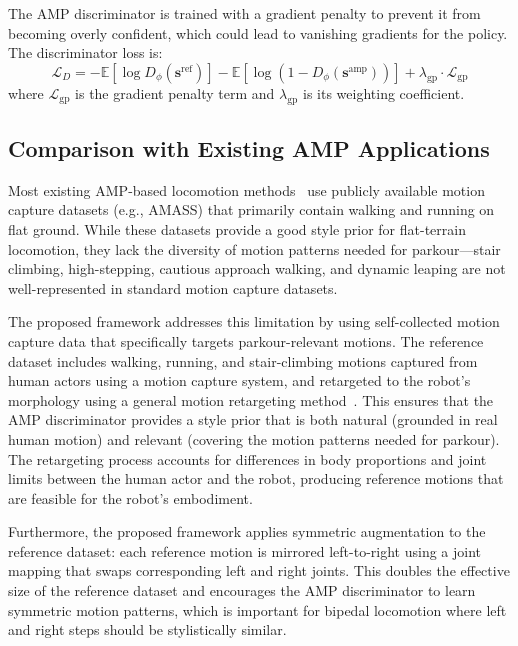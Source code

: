 The AMP discriminator is trained with a gradient penalty to prevent it from becoming overly confident, which could lead to vanishing gradients for the policy. The discriminator loss is:
\begin{equation}
    \mathcal{L}_D = -\mathbb{E}[\log D_\phi(\mathbf{s}^{\text{ref}})] - \mathbb{E}[\log(1 - D_\phi(\mathbf{s}^{\text{amp}}))] + \lambda_{\text{gp}} \cdot \mathcal{L}_{\text{gp}}
\end{equation}
where $\mathcal{L}_{\text{gp}}$ is the gradient penalty term and $\lambda_{\text{gp}}$ is its weighting coefficient.

\subsection{Comparison with Existing AMP Applications}

Most existing AMP-based locomotion methods~\cite{peng2021amp,zhang2024advdiscriminators} use publicly available motion capture datasets (e.g., AMASS) that primarily contain walking and running on flat ground. While these datasets provide a good style prior for flat-terrain locomotion, they lack the diversity of motion patterns needed for parkour---stair climbing, high-stepping, cautious approach walking, and dynamic leaping are not well-represented in standard motion capture datasets.

The proposed framework addresses this limitation by using self-collected motion capture data that specifically targets parkour-relevant motions. The reference dataset includes walking, running, and stair-climbing motions captured from human actors using a motion capture system, and retargeted to the robot's morphology using a general motion retargeting method~\cite{araujo2024retargeting}. This ensures that the AMP discriminator provides a style prior that is both natural (grounded in real human motion) and relevant (covering the motion patterns needed for parkour). The retargeting process accounts for differences in body proportions and joint limits between the human actor and the robot, producing reference motions that are feasible for the robot's embodiment.

Furthermore, the proposed framework applies symmetric augmentation to the reference dataset: each reference motion is mirrored left-to-right using a joint mapping that swaps corresponding left and right joints. This doubles the effective size of the reference dataset and encourages the AMP discriminator to learn symmetric motion patterns, which is important for bipedal locomotion where left and right steps should be stylistically similar.

